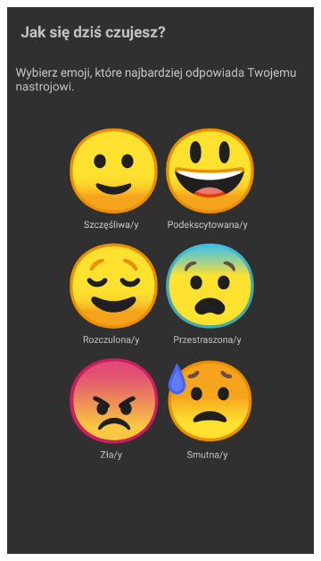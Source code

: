 \begin{figure}[H]
	\centering
	\begin{subfigure}{0.35\textwidth}
		\centering
		\includegraphics[scale=0.13]{rozdzial3/screen-emoji.png}
		\subcaption{\label{subfigure_a}}
	\end{subfigure}
	\begin{subfigure}{0.35\textwidth}
		\centering

\end{subfigure}
\end{figure}
